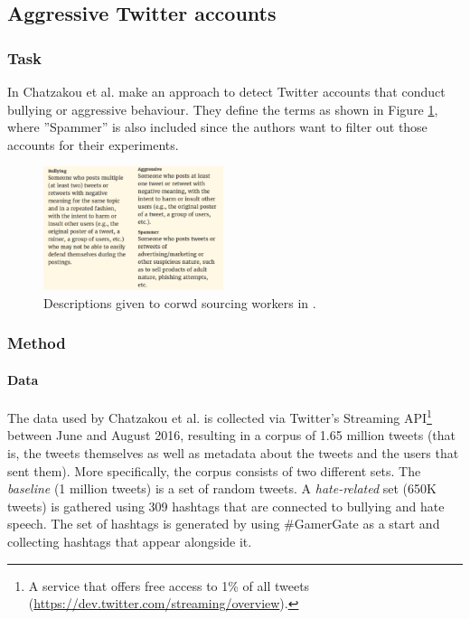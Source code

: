\documentclass{proseminar}
\begin{document}
\subsection{Aggressive Twitter accounts}
\subsubsection{Task}
In \cite{Twitter:2017} Chatzakou et al. make an approach to detect Twitter accounts that conduct bullying or aggressive behaviour. They define the terms as shown in Figure \ref{fig:twitter_defs}, where ''Spammer'' is also included since the authors want to filter out those accounts for their experiments.

\begin{figure}
\centering
\includegraphics[width=0.47\textwidth]{img/twitter_defs}
\caption{Descriptions given to corwd sourcing workers in \cite{Twitter:2017}.}
\label{fig:twitter_defs}
\end{figure}

\subsubsection{Method}
\paragraph{Data} The data used by Chatzakou et al. is collected via Twitter's Streaming API\footnote{A service that offers free access to 1\% of all tweets (\url{https://dev.twitter.com/streaming/overview}).} between June and August 2016, resulting in a corpus of 1.65 million tweets (that is, the tweets themselves as well as metadata about the tweets and the users that sent them). More specifically, the corpus consists of two different sets. The \emph{baseline} (1 million tweets) is a set of random tweets. A \emph{hate-related} set (650K tweets) is gathered using 309 hashtags that are connected to bullying and hate speech. The set of hashtags is generated by using \#GamerGate as a start and collecting hashtags that appear alongside it.
\end{document}
